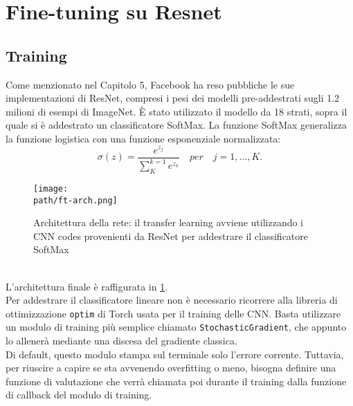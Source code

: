 \section{Fine-tuning su Resnet}
\subsection{Training}
Come menzionato nel Capitolo 5, Facebook ha reso pubbliche le sue implementazioni di ResNet, compresi i pesi dei modelli pre-addestrati sugli 1.2 milioni di esempi di ImageNet. È stato utilizzato il modello da 18 strati, sopra il quale si è addestrato un classificatore SoftMax. La funzione SoftMax \parencite{WSoftmax} generalizza la funzione logistica con una funzione esponenziale normalizzata: 
$$
\sigma(z) = \frac{e^{z_j}}{\sum_{K}^{k=1}e^{z_k}} \quad per \quad j=1,..., K.
$$
\begin{figure}[h!]
 \centering
 \texttt{[image: \\path/ft-arch.png]} 
 \caption{Architettura della rete: il transfer learning avviene utilizzando i CNN codes provenienti da ResNet per addestrare il classificatore SoftMax}
 \label{fig:arch}
\end{figure}
\\
L'architettura finale è raffigurata in \ref{fig:arch}. 
\\

Per addestrare il classificatore lineare non è necessario ricorrere alla libreria di ottimizzazione \texttt{optim} di Torch usata per il training delle CNN. Basta utilizzare un modulo di training più semplice chiamato \texttt{StochasticGradient}, che appunto lo allenerà mediante una discesa del gradiente classica.
\\
Di default, questo modulo stampa sul terminale solo l'errore corrente. Tuttavia, per riuscire a capire se sta avvenendo overfitting o meno, bisogna definire una funzione di valutazione che verrà chiamata poi durante il training dalla funzione di callback del modulo di training.

